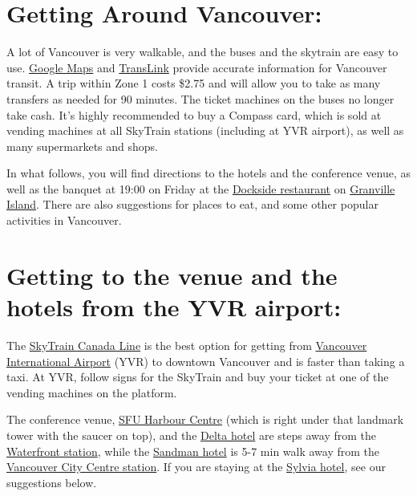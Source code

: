 \documentclass[letterpaper,12pt]{article}
\begin{document}
\section*{Getting Around Vancouver:}

A lot of Vancouver is very walkable, and the buses and the skytrain are easy to use. \href{https://www.google.com/maps/d/viewer?mid=1yeYSdysuwK0qmC32t6TzWAHRAcc&ll=49.2833959021208%2C-123.12375658105464&z=14}{Google Maps} and \href{http://www.translink.ca}{TransLink} provide accurate information for Vancouver transit.  A trip within Zone 1 costs \$2.75 and will allow you to take as many transfers as needed for 90 minutes. The ticket machines on the buses no longer take cash. It's highly recommended to buy a Compass card, which is sold at vending machines at all SkyTrain stations (including at YVR airport), as well as many supermarkets and shops.

In what follows, you will find directions to the hotels and the conference venue, as well as the banquet at 19:00 on Friday at the \href{http://docksidevancouver.com}{Dockside restaurant} on \href{http://granvilleisland.com}{Granville Island}. There are also suggestions for places to eat, and some other popular activities in Vancouver.

\section*{Getting to the venue and the hotels from the YVR airport:}

The \href{http://www.translink.ca/en/Schedules-and-Maps/SkyTrain/SkyTrain-Schedules/Canada-Line.aspx}{SkyTrain Canada Line} is the best option for getting from \href{http://www.yvr.ca/en/passengers}{Vancouver International Airport} (YVR) to downtown Vancouver and is faster than taking a taxi. At YVR, follow signs for the SkyTrain and buy your ticket at one of the vending machines on the platform.

The conference venue, \href{https://www.sfu.ca/mecs/facilities/harbour-centre.html}{SFU Harbour Centre} (which is right under that landmark tower with the saucer on top), and the \href{http://www.marriott.com/hotels/travel/yvrdv-delta-vancouver-suites/}{Delta hotel} are steps away from the \href{http://infomaps.translink.ca/System_Maps/skytrain_station_maps/waterfront_station.pdf}{Waterfront station}, while the \href{https://www.sandmanhotels.com/locations/british-columbia/vancouver/hotels/vancouver-city-centre-vcc?property=VCC&adults=2&children=0&dates=2017-01-24_2017-01-29&groupCode=912299&fromSearch=1&currency=CAD}{Sandman hotel} is 5-7 min walk away from the \href{http://infomaps.translink.ca/System_Maps/skytrain_station_maps/granville_vancouver_city_centre_station.pdf}{Vancouver City Centre station}. If you are staying at the \href{https://sylviahotel.com/}{Sylvia hotel}, see our suggestions below.
\end{document}
